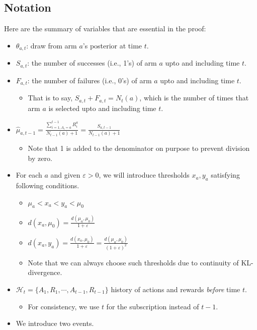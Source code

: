 \documentclass[11pt]{article}
\begin{document}
\subsection{Notation}
Here are the summary of variables that are essential in the proof:
\begin{itemize}
    \item $\theta_{a, t}$: draw from arm $a$'s posterior at time $t$. 
    \item $S_{a, t}$: the number of successes (i.e., 1's) of arm $a$ upto and including time $t$.
    \item $F_{a, t}$: the number of failures (i.e., 0's) of arm $a$ upto and including time $t$. 
    \begin{itemize}
        \item That is to say, $S_{a, t} + F_{a, t} = N_t(a)$, which is the number of times that arm $a$ is selected upto and including time $t$. 
    \end{itemize}
    \item $\hat{\mu}_{a, t-1} = \frac{\sum_{i=1, A_i = a}^{t-1}R_i^a}{N_{t-1}(a)+1} = \frac{S_{a, t-1}}{N_{t-1}(a) + 1}$
    \begin{itemize}
        \item Note that 1 is added to the denominator on purpose to prevent division by zero. 
    \end{itemize}
    \item For each $a$ and given $\varepsilon>0$, we will introduce thresholds $x_a, y_a$ satisfying following conditions. 
    \begin{itemize}
        \item $\mu_a < x_a < y_a < \mu_0$
        \item $d(x_a, \mu_0) = \frac{d(\mu_a, \mu_0)}{1 + \varepsilon}$
        \item $d(x_a, y_a) = \frac{d(x_a, \mu_0)}{1 + \varepsilon} = \frac{d(\mu_a, \mu_0)}{(1 + \varepsilon)^2}$
        \item Note that we can always choose such thresholds due to continuity of KL-divergence. 
    \end{itemize}
    \item $\mathcal{H}_t = \{A_1, R_1, \cdots, A_{t-1}, R_{t-1}\}$ history of actions and rewards \textit{before} time $t$. 
    \begin{itemize}
        \item For consistency, we use $t$ for the subscription instead of $t-1$. 
    \end{itemize}
    \item We introduce two events. 

\end{itemize}
\end{document}

